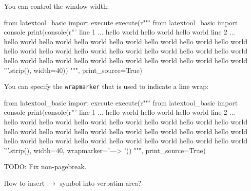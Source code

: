 You can control the window width:
\begin{python}
from latextool_basic import execute
execute(r"""
from latextool_basic import console
print(console(r'''
line 1 ... hello world hello world hello world
line 2 ... hello world hello world hello world hello world hello world hello world hello world hello world hello world hello world hello world hello world hello world hello world hello world hello world hello world hello world hello world hello world hello world
'''.strip(), width=40))
""", print_source=True)
\end{python}

You can specify the \verb!wrapmarker! that is used to indicate a
line wrap:
\begin{python}
from latextool_basic import execute
execute(r"""
from latextool_basic import console
print(console(r'''
line 1 ... hello world hello world hello world
line 2 ... hello world hello world hello world hello world hello world hello world hello world hello world hello world hello world hello world hello world hello world hello world hello world hello world hello world hello world hello world hello world hello world
'''.strip(), width=40, wrapmarker='---> '))
""", print_source=True)
\end{python}


TODO: Fix non-pagebreak.

How to insert $\rightarrow$ symbol into verbatim area?
